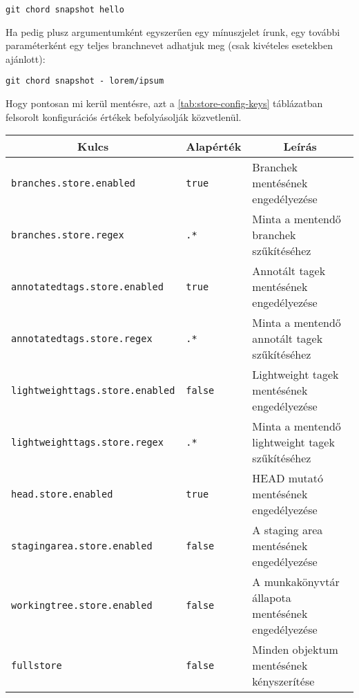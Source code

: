 \documentclass[final]{elteikthesis}[2025/03/25]
\begin{document}
\begin{verbatim}
git chord snapshot hello
\end{verbatim}

Ha pedig plusz argumentumként egyszerűen egy mínuszjelet írunk,
egy további paraméterként egy teljes branchnevet adhatjuk meg (csak kivételes esetekben ajánlott):

\begin{verbatim}
git chord snapshot - lorem/ipsum
\end{verbatim}

Hogy pontosan mi kerül mentésre, azt a \ref{tab:store-config-keys} táblázatban felsorolt
konfigurációs értékek befolyásolják közvetlenül.

\begin{table}[h]
\captionsetup{justification=justified, singlelinecheck=false}
\begin{center}
\begin{tabular}{|l|l|p{5cm}|} 
 \hline
 \multicolumn{1}{|c}{\textbf{Kulcs}} &
 \multicolumn{1}{|c}{\textbf{Alapérték}} &
 \multicolumn{1}{|c|}{\textbf{Leírás}} \\
 \hline\hline
 
 \texttt{branches.store.enabled} & \texttt{true} & Branchek mentésének engedélyezése\vspace{0.5em} \\
 \texttt{branches.store.regex} & \texttt{.*} & Minta a mentendő branchek szűkítéséhez\vspace{0.5em} \\
 \texttt{annotatedtags.store.enabled} & \texttt{true} & Annotált tagek mentésének engedélyezése\vspace{0.5em} \\
 \texttt{annotatedtags.store.regex} & \texttt{.*} & Minta a mentendő annotált tagek szűkítéséhez\vspace{0.5em} \\
 \texttt{lightweighttags.store.enabled} & \texttt{false} & Lightweight tagek mentésének engedélyezése\vspace{0.5em} \\
 \texttt{lightweighttags.store.regex} & \texttt{.*} & Minta a mentendő lightweight tagek szűkítéséhez\vspace{0.5em} \\
 \texttt{head.store.enabled} & \texttt{true} & HEAD mutató mentésének engedélyezése\vspace{0.5em} \\
 \texttt{stagingarea.store.enabled} & \texttt{false} & A staging area mentésének engedélyezése\vspace{0.5em} \\
 \texttt{workingtree.store.enabled} & \texttt{false} & A munkakönyvtár állapota mentésének engedélyezése\vspace{0.5em} \\
 \texttt{fullstore} & \texttt{false} & Minden objektum mentésének kényszerítése \\
 

\end{tabular}
\end{center}
\end{table}
\end{document}
